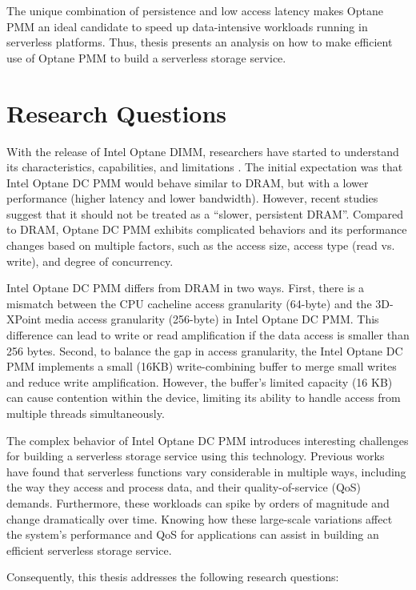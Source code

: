 The unique combination of persistence and low access latency makes Optane PMM an ideal candidate to speed up data-intensive workloads running in serverless platforms. Thus, thesis presents an analysis on how to make efficient use of Optane PMM to build a serverless storage service.

\section{Research Questions}

With the release of Intel Optane DIMM, researchers have started to understand its characteristics, capabilities, and limitations \cite{izraelevitz2019basic, yang2020empirical, wu2020ribbon}. The initial expectation was that Intel Optane DC PMM would behave similar to DRAM, but with a lower performance (higher latency and lower bandwidth). However, recent studies suggest that it should not be treated as a “slower, persistent DRAM”. Compared to DRAM, Optane DC PMM exhibits complicated behaviors and its performance changes based on multiple factors, such as the access size, access type (read vs. write), and degree of concurrency.

Intel Optane DC PMM differs from DRAM in two ways. First, there is a mismatch between the CPU cacheline access granularity (64-byte) and the 3D-XPoint media access granularity (256-byte) in Intel Optane DC PMM. This difference can lead to write or read amplification if the data access is smaller than 256 bytes. Second, to balance the gap in access granularity, the Intel Optane DC PMM implements a small (16KB) write-combining buffer to merge small writes and reduce write amplification. However, the buffer’s limited capacity (16 KB) can cause contention within the device, limiting its ability to handle access from multiple threads simultaneously.

The complex behavior of Intel Optane DC PMM introduces interesting challenges for building a serverless storage service using this technology. Previous works have found that serverless functions vary considerable in multiple ways, including the way they access and process data, and their quality-of-service (QoS) demands. Furthermore, these workloads can spike by orders of magnitude and change dramatically over time. Knowing how these large-scale variations affect the system’s performance and QoS for applications can assist in building an efficient serverless storage service.

Consequently, this thesis addresses the following research questions:

